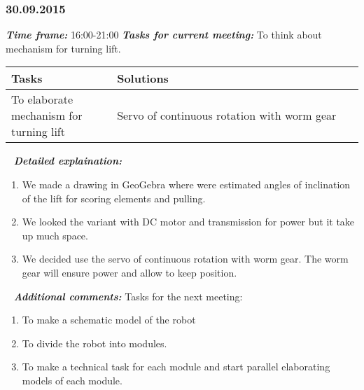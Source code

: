 \subsubsection{30.09.2015}
	\textit{\textbf{Time frame:}} 16:00-21:00 \newline
	\textit{\textbf{Tasks for current meeting:}} To think about mechanism for turning lift.

  \begin{table}[H]
	\vspace{-2mm}
	\begin{center}
		\begin{tabular}{|p{0.3\linewidth}|p{0.7\linewidth}|}
			\hline
			Tasks & Solutions \\
			\hline
			To elaborate mechanism for turning lift & Servo of continuous rotation with worm gear \\
			\hline
		\end{tabular}
	\end{center}
  \end{table}
  
   \newline
  \textit{\textbf{Detailed explaination:}}
  \begin{enumerate}
  	\item We made a drawing in GeoGebra where were estimated angles of inclination of the lift for scoring elements and pulling.
  	
  	\item We looked the variant with DC motor and transmission for power but it take up much space.
  	
  	\item We decided use the servo of continuous rotation with worm gear. The worm gear will ensure power and allow to keep position.
  	

  \end{enumerate}
  
   \newline
  \textit{\textbf{Additional comments:}} \newline
  Tasks for the next meeting:
  \begin{enumerate}
  	\item To make a schematic model of the robot
  	
  	\item To divide the robot into modules.
  	
  	\item To make a technical task for each module and start parallel elaborating models of each module.
  \end{enumerate}
  
\fillpage
